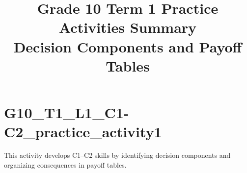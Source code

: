 \makeatletter
{}
\makeatother






\title{Grade 10 Term 1 Practice Activities Summary\\Decision Components and Payoff Tables}
\author{}
\date{}


	\maketitle
	
	\setcounter{tocdepth}{1}
	\setcounter{secnumdepth}{2}
	\label{toc}
	\tableofcontents
	
	\section{G10\_T1\_L1\_C1-C2\_practice\_activity1}
	This activity develops C1--C2 skills by identifying decision components and organizing consequences in payoff tables.
	
